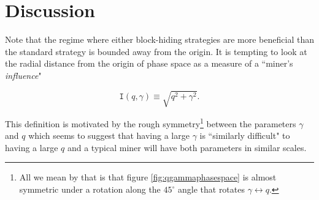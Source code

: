 \documentclass[letterpaper,12pt]{report}
\theoremstyle{plain}
\theoremstyle{definition}
\begin{document}
\noindent%
\begin{minipage}{\linewidth}
\label{fig:qgammaphasespace}
\end{minipage}
\linebreak

\section{Discussion}

Note that the regime where either block-hiding strategies are more beneficial than the standard strategy is bounded away from the origin. It is tempting to look at the radial distance from the origin of phase space as a measure of a ``miner's \textit{influence}" 

\begin{equation}
\mathtt{I}(q,\gamma)\equiv \sqrt{q^2+\gamma^2}.
\end{equation}


This definition is motivated by the rough symmetry\footnote{All we mean by that is that figure \ref{fig:qgammaphasespace} is almost symmetric under a rotation along the $45^{\circ}$ angle that rotates $\gamma \leftrightarrow q$.} between the parameters $\gamma$ and $q$ which seems to suggest that having a large $\gamma$ is ``similarly difficult" to having a large $q$ and a typical miner will have both parameters in similar scales. 
\end{document}

